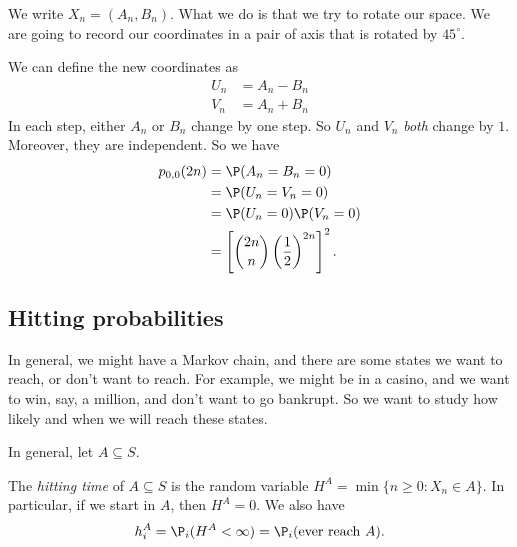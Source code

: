 \documentclass[a4paper]{article}
\begin{document}
We write $X_n = (A_n, B_n)$. What we do is that we try to rotate our space. We are going to record our coordinates in a pair of axis that is rotated by $45^\circ$.
\begin{center}
\end{center}
We can define the new coordinates as
\begin{align*}
  U_n &= A_n - B_n\\
  V_n &= A_n + B_n
\end{align*}
In each step, either $A_n$ or $B_n$ change by one step. So $U_n$ and $V_n$ \emph{both} change by $1$. Moreover, they are independent. So we have
\begin{align*}
  p_{0, 0}(2n) &= \P(A_n = B_n = 0)\\
  &= \P(U_n = V_n = 0)\\
  &= \P(U_n = 0)\P (V_n = 0)\\
  &= \left[\binom{2n}{n}\left(\frac{1}{2}\right)^{2n}\right]^2.
\end{align*}
\subsection{Hitting probabilities}
In general, we might have a Markov chain, and there are some states we want to reach, or don't want to reach. For example, we might be in a casino, and we want to win, say, a million, and don't want to go bankrupt. So we want to study how likely and when we will reach these states.

In general, let $A \subseteq S$.
\begin{defi}
  The \emph{hitting time} of $A \subseteq S$ is the random variable $H^A = \min\{n \geq 0: X_n \in A\}$. In particular, if we start in $A$, then $H^A = 0$. We also have
  \[
    h_i^A = \P_i(H^A < \infty) = \P_i(\text{ever reach }A).
  \]
\end{defi}
\end{document}
